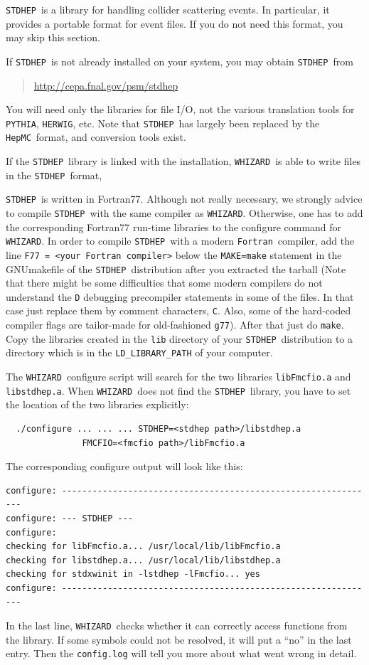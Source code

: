 \documentclass[12pt]{book}
\newcommand{\ttt}[1]{\texttt{#1}}
\newcommand{\whizard}{\texttt{WHIZARD}}
\newcommand{\herwig}{\texttt{HERWIG}}
\newcommand{\pythia}{\texttt{PYTHIA}}
\newcommand{\stdhep}{\texttt{STDHEP}}
\newcommand{\hepmc}{\texttt{HepMC}}
\newcommand{\fortran}{\texttt{Fortran}}
\begin{document}
\stdhep\ is a  library for handling collider scattering
events.  In particular, it provides a portable format for event
files.  If you do not need this format, you may skip this section.

If \stdhep\ is not already installed on your system, you may obtain
\stdhep\ from
\begin{quote}
  \url{http://cepa.fnal.gov/psm/stdhep}
\end{quote}
You will need only the libraries for file I/O, not the various
translation tools for \pythia, \herwig, etc.  Note that \stdhep\ has
largely been replaced by the \hepmc\ format, and conversion tools exist.

If the \stdhep\ library is linked with the installation, \whizard\ is
able to write files in the \stdhep\ format,

\stdhep\ is written in Fortran77. Although not really necessary, we
strongly advice to compile \stdhep\ with the same compiler as
\whizard. Otherwise, one has to add the corresponding Fortran77
run-time libraries to the configure command for \whizard. In order to
compile \stdhep\ with a modern \fortran\ compiler, add the line
\ttt{F77 = <your Fortran compiler>} below the \ttt{MAKE=make}
statement in the GNUmakefile of the \stdhep\ distribution after you
extracted the tarball (Note that there might be some difficulties that
some modern compilers do not understand the \ttt{D} debugging
precompiler statements in some of the files. In that case just replace
them by comment characters, \ttt{C}. Also, some of the hard-coded
compiler flags are tailor-made for old-fashioned \ttt{g77}). After
that just do \ttt{make}. Copy the libraries created in the \ttt{lib}
directory of your \stdhep\ distribution to a directory which is in the
\ttt{LD\_LIBRARY\_PATH} of your computer.

The \whizard\ configure script will search for the two libraries  
\ttt{libFmcfio.a} and \ttt{libstdhep.a}. When \whizard\ does not find
the \stdhep\ library, you have to set the location of the two libraries
explicitly: 
\begin{verbatim}
  ./configure ... ... ... STDHEP=<stdhep path>/libstdhep.a 
               FMCFIO=<fmcfio path>/libFmcfio.a
\end{verbatim}
The  corresponding configure output will look like this:
\begin{verbatim}
configure: --------------------------------------------------------------
configure: --- STDHEP ---
configure:
checking for libFmcfio.a... /usr/local/lib/libFmcfio.a
checking for libstdhep.a... /usr/local/lib/libstdhep.a
checking for stdxwinit in -lstdhep -lFmcfio... yes
configure: -------------------------------------------------------------- 
\end{verbatim}
In the last line, \whizard\ checks whether it can correctly access
functions from the library. If some symbols could not be resolved, it
will put a ``no'' in the last entry. Then the \ttt{config.log} will
tell you more about what went wrong in detail.
\end{document}
